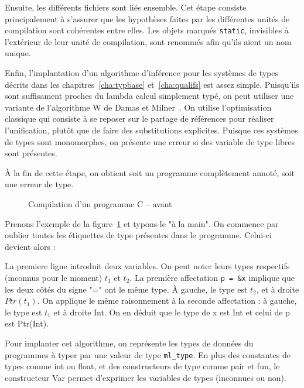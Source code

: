 Ensuite, les différents fichiers sont liés ensemble. Cet étape consiste
principalement à s'assurer que les hypothèses faites par les différentes unités
de compilation sont cohérentes entre elles. Les objets marqués \texttt{static},
invisibles à l'extérieur de leur unité de compilation, sont renommés afin qu'ils
aient un nom unique.

Enfin, l'implantation d'un algorithme d'inférence pour les systèmes de types
décrits dans les chapitres~\ref{cha:typbase} et~\ref{cha:qualifs} est assez
simple. Puisqu'ils sont suffisament proches du lambda calcul simplement typé, on
peut utiliser une variante de l'algorithme W de Damas et
Milner~\cite{DamasMilner}. On utilise l'optimisation classique qui consiste à se
reposer sur le partage de références pour réaliser l'unification, plutôt que de
faire des substitutions explicites. Puisque ces systèmes de types sont
monomorphes, on présente une erreur si des variable de type libres sont
présentes.

À la fin de cette étape, on obtient soit un programme complètement annoté, soit
une erreur de type.

\begin{figure} %


  \caption{Compilation d'un programme C -- avant}
  \label{fig:exunif:c}
\end{figure} %

Prenons l'exemple de la figure~\ref{fig:exunif:c} et typons-le "à la main". On
commence par oublier toutes les étiquettes de type présentes dans le programme.
Celui-ci devient alors :


La premiere ligne introduit deux variables. On peut noter leurs types respectifs
(inconnus pour le moment) $t_1$ et $t_2$. La première affectation \texttt{p =
\&x} implique que les deux côtés du signe "=" ont le même type. À gauche, le
type est $t_2$, et à droite $Ptr(t_1)$. On applique le même raisonnement à la
seconde affectation : à gauche, le type est $t_1$ et à droite Int. On en déduit
que le type de x est Int et celui de p est Ptr(Int).



Pour implanter cet algorithme, on représente les types de données du programmes
à typer par une valeur de type \texttt{ml\_type}. En plus des constantes de
types comme int ou float, et des constructeurs de type comme pair et fun, le
constructeur Var permet d'exprimer les variables de types (inconnues ou non).

